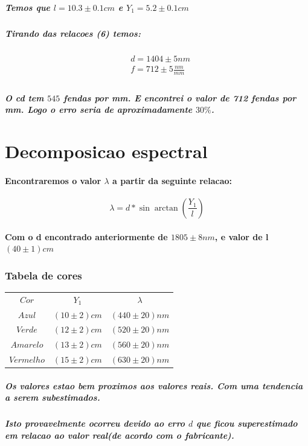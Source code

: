 \documentclass[12pt,twoside, a4paper, twocolumn]{article}
\begin{document}
\subparagraph*{Temos que $l = 10.3 \pm 0.1 cm$ e $Y_1 = 5.2 \pm 0.1 cm$}

\subparagraph*{Tirando das relacoes (6) temos:}

\begin{equation}
  \begin{aligned}
     & d = 1404 \pm 5 nm           \\
     & f = 712 \pm 5 \frac{nm}{mm} \\
  \end{aligned}
\end{equation}

\subparagraph*{O cd tem $545$ fendas por mm. E encontrei o valor de 712 fendas por mm. Logo o erro seria de aproximadamente $30\%$.}

\newpage

\section{Decomposicao espectral}

\paragraph*{Encontraremos o valor $\lambda$ a partir da seguinte relacao:}

\begin{equation}
  \lambda = d * \sin{\arctan{\left(\frac{Y_1}{l}\right)}}
\end{equation}

\paragraph*{Com o d encontrado anteriormente de $1805 \pm 8 nm$, e valor de l $ (40 \pm 1)cm$}


\subsubsection{Tabela de cores}
\begin{center}
  \begin{tabular}{ |c|c|c| }
    \hline
    $Cor$      & $Y_1$          & $\lambda$        \\
    $Azul$     & $(10 \pm 2)cm$ & $(440 \pm 20)nm$ \\
    $Verde$    & $(12 \pm 2)cm$ & $(520 \pm 20)nm$ \\
    $Amarelo$  & $(13 \pm 2)cm$ & $(560 \pm 20)nm$ \\
    $Vermelho$ & $(15 \pm 2)cm$ & $(630 \pm 20)nm$ \\

    \hline
  \end{tabular}
\end{center}

\subparagraph*{Os valores estao bem proximos aos valores reais. Com uma tendencia a serem subestimados. }

\subparagraph*{Isto provavelmente ocorreu devido ao erro $d$ que ficou superestimado em relacao ao valor real(de acordo com o fabricante).}
\end{document}
